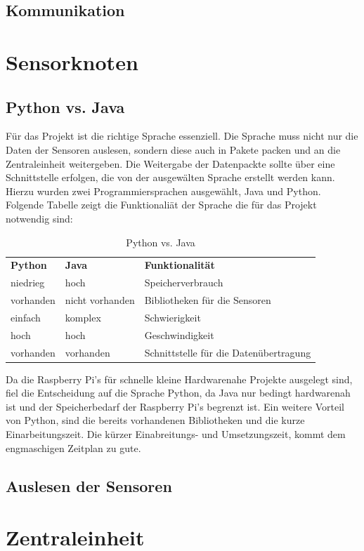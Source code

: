 \subsection{Kommunikation}

\section{Sensorknoten}
\subsection{Python vs. Java}
Für das Projekt ist die richtige Sprache essenziell. Die Sprache muss nicht nur die Daten der Sensoren auslesen, sondern diese auch in Pakete packen und an die Zentraleinheit weitergeben. Die Weitergabe der Datenpackte sollte über eine Schnittstelle erfolgen, die von der ausgewälten Sprache erstellt werden kann. Hierzu wurden zwei Programmiersprachen ausgewählt, Java und Python. Folgende Tabelle zeigt die Funktionaliät der Sprache die für das Projekt notwendig sind:\hfill
\\
\begin{table}[]
	\centering
	\caption{Python vs. Java}
	\label{my-label}
	\begin{tabular}{lll}
	\textbf{Python} & \textbf{Java} & \textbf{Funktionalität}  \\
	niedrieg & hoch &  Speicherverbrauch\\
	vorhanden & nicht vorhanden & Bibliotheken für die Sensoren \\
	einfach & komplex & Schwierigkeit \\
	hoch & hoch & Geschwindigkeit \\
	vorhanden & vorhanden & Schnittstelle für die Datenübertragung
	\end{tabular}
\end{table}
Da die Raspberry Pi's für schnelle kleine Hardwarenahe Projekte ausgelegt sind, fiel die Entscheidung auf die Sprache Python, da Java nur bedingt hardwarenah ist und der Speicherbedarf der Raspberry Pi's begrenzt ist. Ein weitere Vorteil von Python, sind die bereits vorhandenen Bibliotheken und die kurze Einarbeitungszeit. Die kürzer Einabreitungs- und Umsetzungszeit, kommt dem engmaschigen Zeitplan zu gute.

\subsection{Auslesen der Sensoren}

\section{Zentraleinheit}
